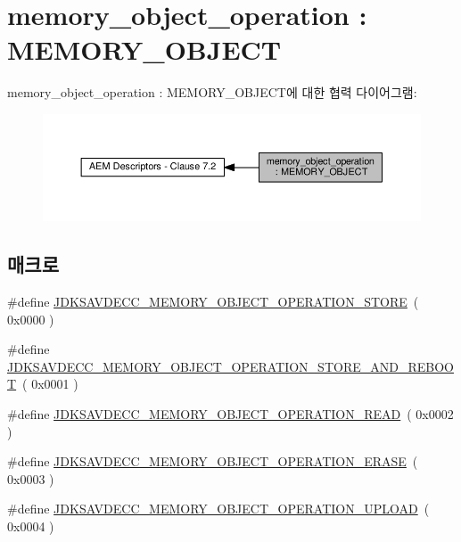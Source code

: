 \hypertarget{group__memory__object__operation}{}\section{memory\+\_\+object\+\_\+operation \+: M\+E\+M\+O\+R\+Y\+\_\+\+O\+B\+J\+E\+CT}
\label{group__memory__object__operation}
memory\+\_\+object\+\_\+operation \+: M\+E\+M\+O\+R\+Y\+\_\+\+O\+B\+J\+E\+C\+T에 대한 협력 다이어그램\+:
\nopagebreak
\begin{figure}[H]
\begin{center}
\leavevmode
\includegraphics[width=350pt]{group__memory__object__operation}
\end{center}
\end{figure}
\subsection*{매크로}
\begin{DoxyCompactItemize}
\item 
\#define \hyperlink{group__memory__object__operation_gab4290dead4205aeac08817e43dea0950}{J\+D\+K\+S\+A\+V\+D\+E\+C\+C\+\_\+\+M\+E\+M\+O\+R\+Y\+\_\+\+O\+B\+J\+E\+C\+T\+\_\+\+O\+P\+E\+R\+A\+T\+I\+O\+N\+\_\+\+S\+T\+O\+RE}~( 0x0000 )
\item 
\#define \hyperlink{group__memory__object__operation_ga61cf203b25372b5af94346edf11b48f1}{J\+D\+K\+S\+A\+V\+D\+E\+C\+C\+\_\+\+M\+E\+M\+O\+R\+Y\+\_\+\+O\+B\+J\+E\+C\+T\+\_\+\+O\+P\+E\+R\+A\+T\+I\+O\+N\+\_\+\+S\+T\+O\+R\+E\+\_\+\+A\+N\+D\+\_\+\+R\+E\+B\+O\+OT}~( 0x0001 )
\item 
\#define \hyperlink{group__memory__object__operation_ga8279f99b6cec699e7cd98bd83eac7efb}{J\+D\+K\+S\+A\+V\+D\+E\+C\+C\+\_\+\+M\+E\+M\+O\+R\+Y\+\_\+\+O\+B\+J\+E\+C\+T\+\_\+\+O\+P\+E\+R\+A\+T\+I\+O\+N\+\_\+\+R\+E\+AD}~( 0x0002 )
\item 
\#define \hyperlink{group__memory__object__operation_ga01164815e60054bc9dc807c5b927429e}{J\+D\+K\+S\+A\+V\+D\+E\+C\+C\+\_\+\+M\+E\+M\+O\+R\+Y\+\_\+\+O\+B\+J\+E\+C\+T\+\_\+\+O\+P\+E\+R\+A\+T\+I\+O\+N\+\_\+\+E\+R\+A\+SE}~( 0x0003 )
\item 
\#define \hyperlink{group__memory__object__operation_ga12771131c3cd62bc914e847886a74f00}{J\+D\+K\+S\+A\+V\+D\+E\+C\+C\+\_\+\+M\+E\+M\+O\+R\+Y\+\_\+\+O\+B\+J\+E\+C\+T\+\_\+\+O\+P\+E\+R\+A\+T\+I\+O\+N\+\_\+\+U\+P\+L\+O\+AD}~( 0x0004 )
\end{DoxyCompactItemize}


